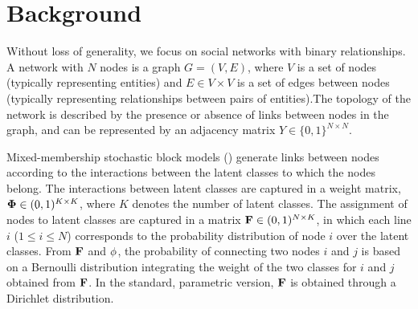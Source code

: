 \section{Background}
\label{sec:background}

Without loss of generality, we focus on social networks with binary relationships. A network with $N$ nodes is a graph $G = (V,E)$, where $V$ is a set of nodes (typically representing entities) and $E \in V \times V$ is a set of edges between nodes (typically representing relationships between pairs of entities).The topology of the network is described by the presence or absence of links between nodes in the graph, and can be represented by an adjacency matrix $Y \in \{0,1\}^{N\times N}$. 

Mixed-membership stochastic block models (\cite{MMSB}) generate links between nodes according to the interactions between the latent classes to which the nodes belong. The interactions between latent classes are captured in a weight matrix, $\mathbf{\Phi} \in (0,1)^{K\times K}$, where $K$ denotes the number of latent classes. The assignment of nodes to latent classes are captured in a matrix $\mathbf{F} \in (0,1)^{N\times K}$, in which each line $i$ ($1\le i \le N$) corresponds to the probability distribution of node $i$ over the latent classes. From $\mathbf{F}$ and $\mathbf{\phi}$, the probability of connecting two nodes $i$ and $j$ is based on a Bernoulli distribution integrating the weight of the two classes for $i$ and $j$ obtained from $\mathbf{F}$. In the standard, parametric version, $\mathbf{F}$ is obtained through a Dirichlet distribution.

